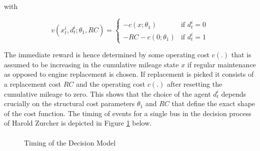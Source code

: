 with

\[v(x^i_t, d^i_t; \theta_1, RC) = \left\{
\begin{array}{lr}
-c(x; \theta_1)  & \mbox{if } d^i_t = 0 \\
-RC -c(0;\theta_1) & \mbox{if } d^i_t = 1
\end{array}
\right.
\]

The immediate reward is hence determined by some operating cost $c(.)$ that is assumed to be increasing in the cumulative mileage state $x$ if regular maintenance as opposed to engine replacement is chosen. If replacement is picked it consists of a replacement cost $RC$ and the operating cost $c(.)$ after resetting the cumulative mileage to zero. This shows that the choice of the agent $d^i_t$ depends crucially on the structural cost parameters $\theta_1$ and $RC$ that define the exact shape of the cost function. The timing of events for a single bus in the decision process of Harold Zurcher is depicted in Figure \ref{Figure1} below.
\paragraph{}

\begin{figure}[H]
	\caption{\label{Figure1}Timing of the Decision Model}
	\vspace{2ex}
\end{figure}
\vspace{2.5ex}


